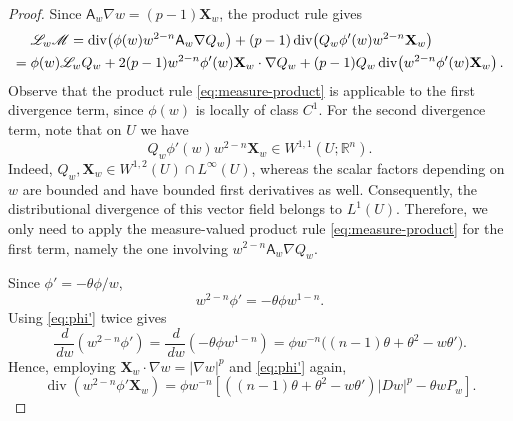\documentclass[reqno,12pt]{amsart}
\numberwithin{equation}{section}
\theoremstyle{remark}
\newcommand{\R}{\mathbb R}
\newcommand{\dd}{\,d}
\newcommand{\Xbf}{\mathbf X}
\newcommand{\Lscr}{\mathscr L}
\newcommand{\Mscr}{\mathscr M}
\begin{document}
\begin{proof}
Since $\mathsf A_w\nabla w=(p-1)\Xbf_w$, the product rule gives
\begin{align}\label{eq:LM-first-expansion}
{}&\Lscr_w\Mscr
=\operatorname{div}\!\left(
 \phi(w)w^{2-n}\mathsf A_w\nabla Q_w
\right) +(p-1)\operatorname{div}\!\left(
 Q_w\phi'(w)w^{2-n}\Xbf_w\right)\notag\\
={}&\phi(w)\Lscr_wQ_w+2(p-1)w^{2-n}\phi'(w) \Xbf_w\cdot\nabla Q_w  +(p-1)Q_w\operatorname{div}\!\left( w^{2-n}\phi'(w)\Xbf_w\right). 
\end{align}
Observe that the product rule \eqref{eq:measure-product} is applicable to the first divergence term, since $\phi(w)$ is locally of class $C^1$. For the second divergence term, note that on $U$ we have
$$
 Q_w\phi'(w)w^{2-n}\Xbf_w\in W^{1,1}(U;\R^n).
$$
Indeed, $Q_w,\Xbf_w\in W^{1,2}(U)\cap L^\infty(U)$, whereas the scalar factors depending on $w$ are bounded and have bounded first derivatives as well. Consequently, the distributional divergence of this vector field belongs to $L^1(U)$. Therefore, we only need to apply the measure-valued product rule \eqref{eq:measure-product} for the first term, namely the one involving $w^{2-n}\mathsf A_w\nabla Q_w$.

Since $\phi'=-\theta\phi/w$,
\begin{equation}\label{eq:phi'}
 w^{2-n}\phi'=-\theta\phi w^{1-n}.
\end{equation}
Using \eqref{eq:phi'} twice gives
$$
\frac{\dd}{\dd w}(w^{2-n}\phi')
=\frac{\dd}{\dd w}(-\theta\phi w^{1-n})
=\phi w^{-n}\bigl((n-1)\theta+\theta^2-w\theta'\bigr).
$$
Hence, employing $\Xbf_w\cdot\nabla w=|\nabla w|^p$
and \eqref{eq:phi'} again,
\begin{equation}\label{eq:div-weighted-phiX}
 \operatorname{div}(w^{2-n}\phi'\Xbf_w)
 =\phi w^{-n}\left[((n-1)\theta+\theta^2-w\theta')|Dw|^p
   -\theta wP_w \right].
\end{equation}


\end{proof}
\end{document}
